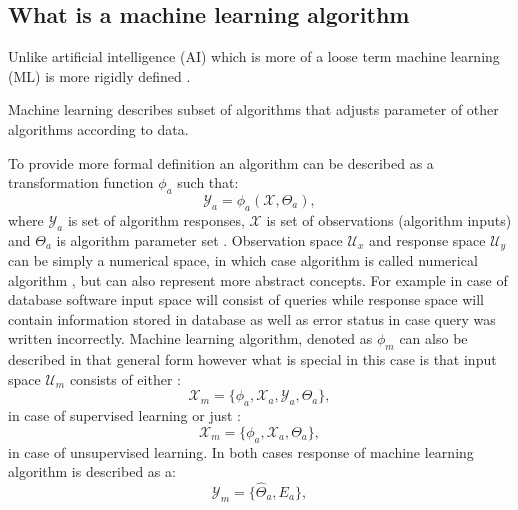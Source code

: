 \FloatBarrier
\subsection{What is a machine learning algorithm}
Unlike artificial intelligence (AI) which is more of a loose term machine learning (ML) is 
more rigidly defined \cite{AurelienGeron2019}.
\begin{definition}
Machine learning  describes subset of algorithms that adjusts parameter of other algorithms 
according to data.
\end{definition}
To provide more formal definition an algorithm can be described as a transformation 
function $\phi_{a}$ such that:
\begin{equation}
	\label{equ:algorithm_general}
	\mathcal{Y}_{a} = \phi_{a}(\mathcal{X},\Theta_{a}),
\end{equation}
where $\mathcal{Y}_{a}$ is set of algorithm responses, $\mathcal{X}$ is set of observations
(algorithm inputs) and $\Theta_{a}$ is algorithm parameter set \cite{Tadeusiewicz1994}.
Observation space $\mathcal{U}_{x}$ and response space $\mathcal{U}_{y}$ can be simply a numerical
space, in which case algorithm is called numerical algorithm \cite{G1989}, but can also represent
more abstract concepts. For example in case of database software input space will consist of 
queries while response space will contain information stored in database as well as error 
status in case query was written incorrectly\cite{Banachowski2013}.
Machine learning algorithm, denoted as $\phi_{m}$ can also be described in that general form
however what is special in this case is that input space $\mathcal{U}_{m}$ consists of either :
\begin{equation}
	\label{equ:supervised_input}
	\mathcal{X}_{m} = \{\phi_{a}, \mathcal{X}_{a}, \mathcal{Y}_{a}, \Theta_{a} \},
\end{equation}
in case of supervised learning or just :
\begin{equation}
	\label{equ:supervised_input}
	\mathcal{X}_{m} = \{\phi_{a}, \mathcal{X}_{a}, \Theta_{a} \},
\end{equation}
in case of unsupervised learning.
In both cases response of machine learning algorithm is described as a:
\begin{equation}
	\label{equ:ml_response}
	\mathcal{Y}_{m} = \{\hat{\Theta}_{a}, E_{a}\},
\end{equation}
